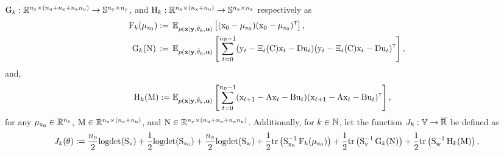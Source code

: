 ${ \mathrm{G} }_k: {\mathbb{R}}^{n_{ \mathrm{y} } \times (n_{ \mathrm{u} } + n_{ \mathrm{x} } + n_{ \mathrm{x} }n_{ \mathrm{u} })} \to{\mathbb{S}}^{n_{ \mathrm{y} }\times n_{ \mathrm{y} }}$, and
${ \mathrm{H} }_k: {\mathbb{R}}^{n_{ \mathrm{x} } \times (n_{ \mathrm{x} } + n_{ \mathrm{u} })} \to{\mathbb{S}}^{n_{ \mathrm{x} }\times n_{ \mathrm{x} }}$ respectively as
\begin{align}
        \mxF_k(\mu_{\vcx_0})\!\, &:= \,
        \mathbb{E}_{p(\mathbf{x}|\mathbf{y},\hat{\vctheta}_k,\mathbf{u})} \left[(\vcx_0-\vcmu_{\vcx_0}) (\vcx_0-\vcmu_{\vcx_0})^\tr\right], \label{eq:F_k}\\
        \mxG_k(\mxN)\, &:= \,
        \mathbb{E}_{p(\mathbf{x}|\mathbf{y},\hat{\vctheta}_k,\mathbf{u})}
        \left[
        \sum_{t=0}^{\nD-1}  (\vcy_t - \Xi_t(\mxC) \vcx_t - \mxD \vcu_t) (\vcy_t - \Xi_t(\mxC) \vcx_t - \mxD \vcu_t)^\tr\right],\label{eq:G_k}
\end{align}
and, 
\begin{align}
    \mxH_k(\mxM) &:= \mathbb{E}_{p(\mathbf{x}|\mathbf{y},\hat{\vctheta}_k,\mathbf{u})}
    \left[
    \sum_{t=0}^{\nD-1}(\vcx_{t+1} - \mxA \vcx_t - \mxB \vcu_t) (\vcx_{t+1} - \mxA \vcx_t - \mxB \vcu_t)^\tr\right],\label{eq:H_k}
\end{align}
for any 
$\mu_{{ \mathrm{x} }_0} \in {\mathbb{R}}^{n_{ \mathrm{x} }}$, 
${ \mathrm{M} } \in {\mathbb{R}}^{n_{ \mathrm{x} } \times (n_{ \mathrm{x} } + n_{ \mathrm{u} })}$, and ${ \mathrm{N} } \in {\mathbb{R}}^{n_{ \mathrm{y} } \times (n_{ \mathrm{u} } + n_{ \mathrm{x} } + n_{ \mathrm{x} }n_{ \mathrm{u} })}$.
Additionally, for $k \in {\mathbb{N}}$, let the function $J_k: {\mathbb{V}} \to \overline{{\mathbb{R}}}$ be defined as 
\begin{equation}\label{eq:J function}
    J_k(\vctheta) := 
        \frac{\nD}{2} \logdet(\mxS_\vcv) 
        +\frac{1}{2}   \logdet(\mxS_{\vcx_0})
        +\frac{\nD}{2} \logdet(\mxS_\vcw) 
        +\frac{1}{2} \trace \left(\mxS_{\vcx_0}^{-1}\, \mxF_k(\mu_{\vcx_0}) \right)
        +\frac{1}{2} \trace \left(\mxS_\vcv^{-1}\, \mxG_k(\mxN)\right) 
        +\frac{1}{2} \trace \left(\mxS_\vcw^{-1}\, \mxH_k(\mxM)\right),
\end{equation}

